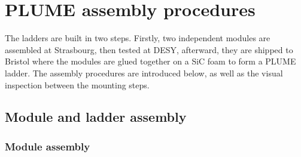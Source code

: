 
 
 \minitoc
  

\section{PLUME assembly procedures}

  The ladders are built in two steps. 
  Firstly, two independent modules are assembled at Strasbourg, then tested at \gls{DESY}, afterward, they are shipped to Bristol where the modules are glued together on a \gls{SiC} foam to form a \gls{PLUME} ladder.
  The assembly procedures are introduced below, as well as the visual inspection between the mounting steps.

  \subsection{Module and ladder assembly}

    \subsubsection{Module assembly}
    \label{subsec:modAssembly}

